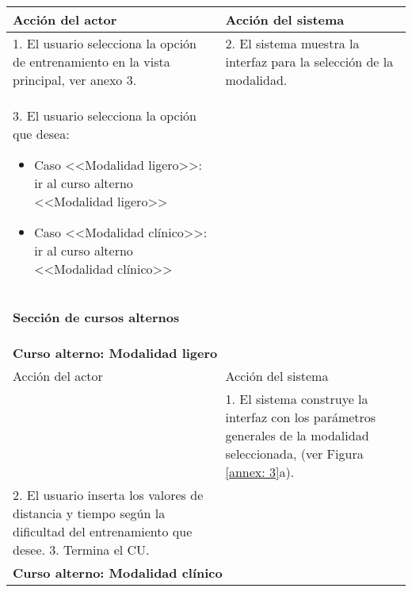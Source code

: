 \begin{table}
\begin{tabularx}{1.1\textwidth}{|X|X|}
        Acción del actor & Acción del sistema \\\hline
        1. El usuario selecciona la opción de entrenamiento en la vista principal, ver anexo 3. & 2. El sistema muestra la interfaz para la selección de la modalidad. \\\hline
        3. El usuario selecciona la opción que desea:
        \begin{itemize}
            \item Caso <<Modalidad ligero>>: ir al curso alterno <<Modalidad ligero>>
            \item Caso <<Modalidad clínico>>: ir al curso alterno <<Modalidad clínico>>
        \end{itemize} &  \\\hline
        \multicolumn{2}{|X|}{        
        \begin{minipage}[t]{0.925\columnwidth}
            \begin{center}
                \textbf{Sección de cursos alternos}
            \end{center}
        \end{minipage}} \\\hline
        \multicolumn{2}{|X|}{        
        \begin{minipage}[t]{0.925\columnwidth}
                \textbf{Curso alterno: Modalidad ligero}
        \end{minipage}} \\\hline
        
        Acción del actor & Acción del sistema \\\hline
        & 
        1. El sistema construye la interfaz con los parámetros generales de la modalidad seleccionada, (ver Figura \ref{annex: 3}a). \\\hline
        2. El usuario inserta los valores de distancia y tiempo según la dificultad del entrenamiento que desee. 
        3. Termina el CU. 
        & \\\hline
        \multicolumn{2}{|X|}{        
        \begin{minipage}[t]{0.925\columnwidth}
                \textbf{Curso alterno: Modalidad clínico}
        \end{minipage}} \\\hline
        

\end{tabularx}
\end{table}

